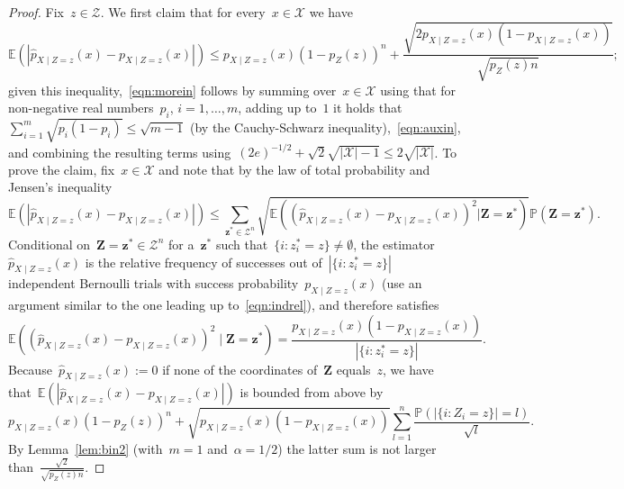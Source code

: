 \documentclass[11pt, a4paper]{article}
\theoremstyle{definition}
\begin{document}
\begin{proof}
Fix~$z \in \mathcal{Z}$. We first claim that for every~$x \in \mathcal{X}$ we have
\begin{equation*}
\mathbb{E}\left(| \hat{p}_{X \mid  Z = z}(x) - p_{X \mid  Z = z}(x)|\right) \leq p_{X \mid  Z = z}(x) (1-p_Z(z))^n + \frac{\sqrt{2 p_{X\mid Z = z}(x)(1-p_{X\mid Z = z}(x))}}{\sqrt{p_Z(z) n}};
\end{equation*} 
given this inequality,~\eqref{eqn:morein} follows by summing over~$x \in \mathcal{X}$ using that for non-negative real numbers~$p_i$, $i = 1, \hdots, m$, adding up to~$1$ it holds that~$\sum_{i = 1}^m \sqrt{p_i (1-p_i)} \leq \sqrt{m-1}$ (by the Cauchy-Schwarz inequality),~\eqref{eqn:auxin}, and combining the resulting terms using~$(2e)^{-1/2} + \sqrt{2} \sqrt{|\mathcal{X}| - 1} \leq 2 \sqrt{ |\mathcal{X}|}$. To prove the claim, fix~$x \in \mathcal{X}$ and note that by the law of total probability and Jensen's inequality $$\mathbb{E}(| \hat{p}_{X \mid  Z = z}(x) - p_{X \mid  Z = z}(x)|) \leq \sum_{\bm{z}^* \in \mathcal{Z}^n} \sqrt{\mathbb{E}(( \hat{p}_{X \mid  Z = z}(x) - p_{X \mid  Z = z}(x))^2 | \bm{Z} = \bm{z}^*)} \mathbb{P}(\bm{Z} = \bm{z}^*).$$ Conditional on~$\bm{Z} = \bm{z}^* \in \mathcal{Z}^n$ for a~$\bm{z}^*$ such that~$\{i: z^*_i = z\} \neq \emptyset$, the estimator~$\hat{p}_{X\mid Z = z}(x)$ is the relative frequency of successes out of~$|\{i: z^*_i = z\}|$ independent Bernoulli trials with success probability~$p_{X\mid Z = z}(x)$ (use an argument similar to the one leading up to~\eqref{eqn:indrel}), and therefore satisfies $$\mathbb{E}\left(( \hat{p}_{X \mid  Z = z}(x) - p_{X \mid  Z = z}(x))^2 \mid \bm{Z} = \bm{z}^*\right) = \frac{p_{X\mid Z = z}(x)(1-p_{X\mid Z = z}(x))}{|\{i: z^*_i = z\}|}.$$  Because~$\hat{p}_{X \mid  Z = z}(x) := 0$ if none of the coordinates of~$\bm{Z}$ equals~$z$, we have that~$\mathbb{E}(| \hat{p}_{X \mid  Z = z}(x) - p_{X \mid  Z = z}(x)|)$ is bounded from above by~$$p_{X\mid Z = z}(x) (1-p_Z(z))^n + \sqrt{p_{X\mid Z = z}(x)(1-p_{X\mid Z = z}(x))} \sum_{l = 1}^n \frac{\mathbb{P}(|\{i: Z_i = z\}| = l)}{\sqrt{l}} .$$ By Lemma~\ref{lem:bin2} (with~$m = 1$ and~$\alpha = 1/2$) the latter sum is not larger than~$\frac{\sqrt{2}}{\sqrt{p_Z(z) n}}.$ 


\end{proof}
\end{document}
